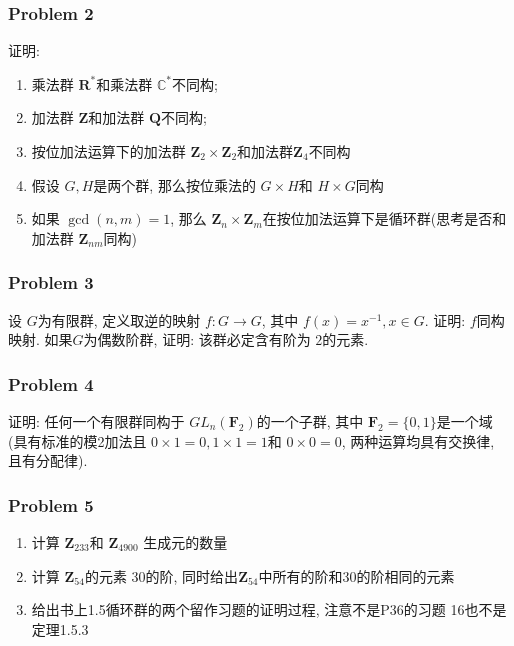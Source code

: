 \documentclass[a4paper,12pt]{ctexart}
\newcommand{\Z}{\mathbf{Z}}
\newcommand{\F}{\mathbf{F}}
\newcommand{\Q}{\mathbf{Q}}
\newcommand{\R}{\mathbf{R}}
\begin{document}
\subsubsection*{Problem 2} 
    证明: \begin{enumerate}
      \item 乘法群 $ \R^* $和乘法群 $ \mathbb{C}^* $不同构; 
      \item 加法群 $ \Z $和加法群 $ \Q $不同构; 
      \item 按位加法运算下的加法群 $ \Z_2\times\Z_2 $和加法群$ \Z_4 $不同构
      \item 假设 $ G,H $是两个群, 那么按位乘法的 $ G\times H $和 $ H\times G $同构
      \item 如果 $ \gcd(n,m)=1 $, 那么 $ \Z_n\times\Z_m $在按位加法运算下是循环群(思考是否和加法群 $ \Z_{nm} $同构)
    \end{enumerate}
\subsubsection*{Problem 3}
    设 $ G $为有限群, 定义取逆的映射 $ f:G\rightarrow G $, 其中 $ f(x)=x^{-1},x\in G $. 
    证明: $ f $同构映射. 如果$G$为偶数阶群, 证明: 该群必定含有阶为 $ 2 $的元素.
\subsubsection*{Problem 4}
    证明: 任何一个有限群同构于 $ GL_n(\F_2) $的一个子群, 其中 $ \F_2=\{0,1\} $是一个域(具有标准的模2加法且 $ 0\times 1=0,1\times 1=1 $和 $ 0\times 0=0 $, 两种运算均具有交换律, 且有分配律).
\subsubsection*{Problem 5}
    \begin{enumerate}
      \item 计算 $ \Z_{233} $和 $ \Z_{4900} $ 生成元的数量
      \item 计算 $ \Z_{54} $的元素 $ 30 $的阶, 同时给出$ \Z_{54} $中所有的阶和$ 30 $的阶相同的元素
      \item 给出书上1.5循环群的两个留作习题的证明过程, 注意不是P36的习题 16也不是定理1.5.3
    \end{enumerate}
\end{document}
